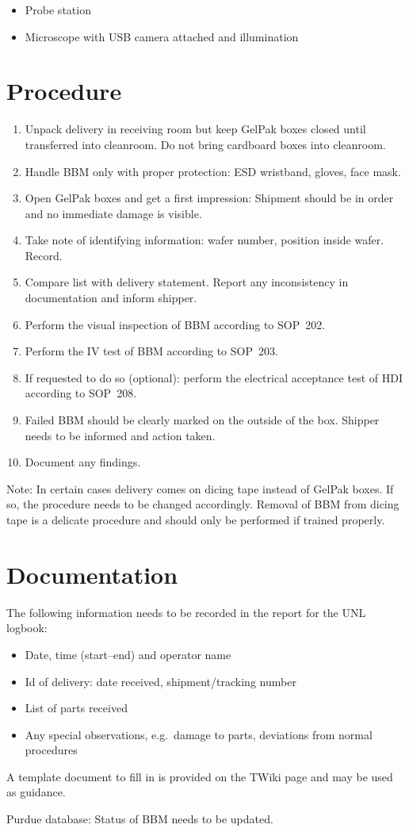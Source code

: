 \documentclass[12pt]{unlsilabsop}
\begin{document}
\begin{itemize}
    \item Probe station
    \item Microscope with USB camera attached and illumination
\end{itemize}

\section{Procedure}

\begin{enumerate}
    \item Unpack delivery in receiving room but keep GelPak boxes closed until transferred into cleanroom. Do not bring cardboard boxes into cleanroom.
    \item Handle BBM only with proper protection: ESD wristband, gloves, face mask.
    \item Open GelPak boxes and get a first impression: Shipment should be in order and no immediate damage is visible.
    \item Take note of identifying information: wafer number, position inside wafer. Record.
    \item Compare list with delivery statement. Report any inconsistency in documentation and inform shipper.
    \item Perform the visual inspection of BBM according to SOP~202.
    \item Perform the IV test of BBM according to SOP~203.
    \item If requested to do so (optional): perform the electrical acceptance test of HDI according to SOP~208.
    \item Failed BBM should be clearly marked on the outside of the box. Shipper needs to be informed and action taken.
    \item Document any findings.
\end{enumerate}
Note: In certain cases delivery comes on dicing tape instead of GelPak boxes. If so, the procedure needs to be changed accordingly. Removal of BBM from dicing tape is a delicate procedure and should only be performed if trained properly.

\section{Documentation}
The following information needs to be recorded in the report for the UNL logbook:
\begin{itemize}
    \item Date, time (start--end) and operator name
    \item Id of delivery: date received, shipment/tracking number
    \item List of parts received
    \item Any special observations, e.g.~damage to parts, deviations from normal procedures
\end{itemize}
A template document to fill in is provided on the TWiki page and may be used as guidance.

Purdue database: Status of BBM needs to be updated.
\end{document}
